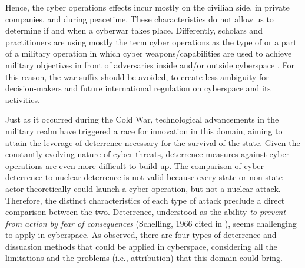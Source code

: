 Hence, the cyber operations effects incur mostly on the civilian side, in private companies, and during peacetime. These characteristics do not allow us to determine if and when a cyberwar takes place. Differently, scholars and practitioners are using mostly the term cyber operations as the type of or a part of a military operation in which cyber weapons/capabilities are used to achieve military objectives in front of adversaries inside and/or outside cyberspace \autocite[35]{maathuis_2018_developing}. For this reason, the war suffix should be avoided, to create less ambiguity for decision-makers and future international regulation on cyberspace and its activities. 

Just as it occurred during the Cold War, technological advancements in the military realm have triggered a race for innovation in this domain, aiming to attain the leverage of deterrence necessary for the survival of the state. Given the constantly evolving nature of cyber threats, deterrence measures against cyber operations are even more difficult to build up. The comparison of cyber deterrence to nuclear deterrence is not valid because every state or non-state actor theoretically could launch a cyber operation, but not a nuclear attack. Therefore, the distinct characteristics of each type of attack preclude a direct comparison between the two.  Deterrence, understood as the ability \textit{to prevent from action by fear of consequences} (Schelling, 1966 cited in \textcite{nye_2017_deterrence}), seems challenging to apply in cyberspace. As \textcite[54]{nye_2017_deterrence} observed, there are four types of deterrence and dissuasion methods that could be applied in cyberspace, considering all the limitations and the problems (i.e., attribution) that this domain could bring. 

